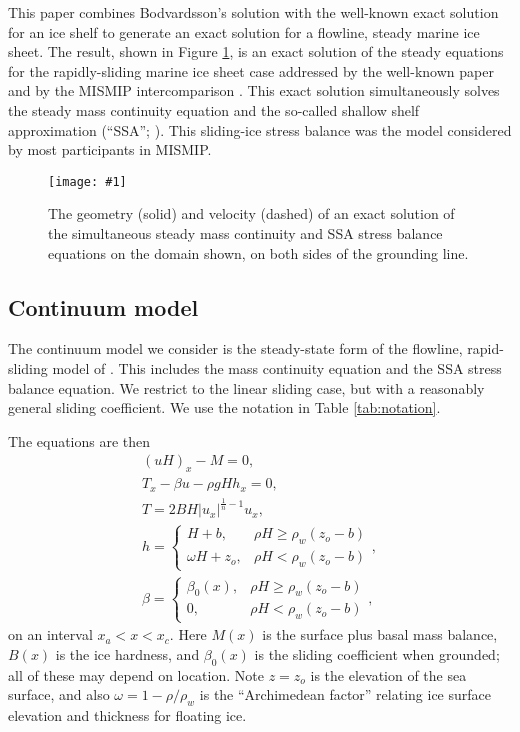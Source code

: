 \documentclass[twocolumn,letterpaper]{igs}
\newcommand{\onecol}[1]{\texttt{[image: \#1]}}
\begin{document}
This paper combines Bodvardsson's solution with the well-known exact solution for an ice shelf \citep{vanderVeen83,vanderVeen} to generate an exact solution for a flowline, steady marine ice sheet.  The result, shown in Figure \ref{fig:exactmarine}, is an exact solution of the steady equations for the rapidly-sliding marine ice sheet case addressed by the well-known paper \cite{SchoofMarine1} and by the MISMIP intercomparison \citep{MISMIP2012}.  This exact solution simultaneously solves the steady mass continuity equation and the so-called shallow shelf approximation (``SSA''; \citep{BBssasliding,MacAyeal,WeisGreveHutter}).  This sliding-ice stress balance was the model considered by most participants in MISMIP.

\begin{figure}[ht]
\onecol{exactmarine-geometry}
\caption{The geometry (solid) and velocity (dashed) of an exact solution of the simultaneous steady mass continuity and SSA stress balance equations on the domain shown, on both sides of the grounding line.} \label{fig:exactmarine}
\end{figure}


\subsection*{Continuum model}

The continuum model we consider is the steady-state form of the flowline, rapid-sliding model of \citep[equations (2.1)--(2.5)]{SchoofMarine1}.  This includes the mass continuity equation and the SSA stress balance equation.  We restrict to the linear sliding case, but with a reasonably general sliding coefficient.  We use the notation in Table \ref{tab:notation}.

The equations are then
\begin{gather}
(uH)_x - M = 0, \label{eq:steadymass} \\
T_x - \beta u - \rho g H h_x = 0, \label{eq:steadySSA} \\
T = 2 B H |u_x|^{\frac{1}{n}-1} u_x, \label{eq:Tstress} \\
h = \begin{cases} H+b,            & \rho H \ge \rho_w (z_o - b) \\
                  \omega H + z_o, & \rho H < \rho_w (z_o - b) \end{cases}, \label{eq:surface} \\
\beta = \begin{cases} \beta_0(x), & \rho H \ge \rho_w (z_o - b) \\
                      0,          & \rho H < \rho_w (z_o - b) \end{cases}, \label{eq:betafull}
\end{gather}
on an interval $x_a < x < x_c$.  Here $M(x)$ is the surface plus basal mass balance, $B(x)$ is the ice hardness, and $\beta_0(x)$ is the sliding coefficient when grounded; all of these may depend on location.  Note $z=z_o$ is the elevation of the sea surface, and also $\omega = 1 - \rho/\rho_w$ is the ``Archimedean factor'' relating ice surface elevation and thickness for floating ice.
\end{document}
